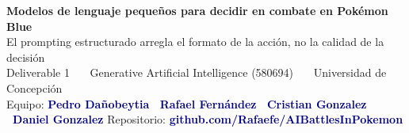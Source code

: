 \documentclass[9pt,a4paper]{extarticle}
\newcommand{\ph}[1]{\colorbox{note}{\textcolor{navy}{\textbf{#1}}}}
\begin{document}
\small

\begin{tcolorbox}[colback=navy,colframe=navy,boxrule=0pt,left=3mm,right=3mm,
                  top=2mm,bottom=2mm,arc=1mm]
{\color{white}\bfseries\LARGE Modelos de lenguaje peque\~nos para decidir en combate en Pok\'emon Blue}\\[1.1mm]
{\color{white!85}\large El prompting estructurado arregla el formato de la acci\'on, no la calidad de la decisi\'on}\\[2mm]
{\color{white!75}\footnotesize
Deliverable 1 \ \textbullet\ \ Generative Artificial Intelligence (580694) \ \textbullet\ \ Universidad de Concepci\'on}\\[1.4mm]
{\footnotesize\color{white!85}Equipo:} \ph{Pedro Dañobeytia \textbullet\ Rafael Fernández \textbullet\ Cristian Gonzalez \textbullet\ Daniel Gonzalez}
\hfill
{\footnotesize\color{white!85}Repositorio:} \ph{github.com/Rafaefe/AIBattlesInPokemon}
\end{tcolorbox}
\end{document}
